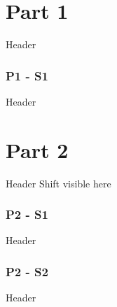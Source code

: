 \documentclass[]{beamer}
\begin{document}
\part{Part 1}

\begin{frame}{Header}
\end{frame}

\section{P1 - S1}
\begin{frame}{Header}
\end{frame}

\part{Part 2}

\begin{frame}{Header}
Shift visible here
\end{frame}

\section{P2 - S1}
\begin{frame}{Header}
\end{frame}

\section{P2 - S2}
\begin{frame}{Header}
\end{frame}
\end{document}
